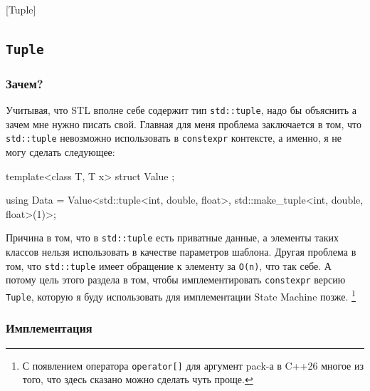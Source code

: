 [Tuple]


\subsection{\texttt{Tuple}}
\label{section::Tuple}

\subsubsection{Зачем?}

Учитывая, что STL вполне себе содержит тип \verb"std::tuple", надо бы объяснить а зачем мне нужно писать свой.
Главная для меня проблема заключается в том, что  \verb"std::tuple" невозможно использовать в \verb"constexpr" контексте, а именно, я не могу сделать следующее:
\begin{cppcode}[\nonumbers]
template<class T, T x>
struct Value {};

using Data = Value<std::tuple<int, double, float>, std::make_tuple<int, double, float>(1)>;
\end{cppcode}
Причина в том, что в \verb"std::tuple" есть приватные данные, а элементы таких классов нельзя использовать в качестве параметров шаблона.
Другая проблема в том, что \verb"std::tuple" имеет обращение к элементу за \verb"O(n)", что так себе.
А потому цель этого раздела в том, чтобы имплементировать \verb"constexpr" версию \verb"Tuple", которую я буду использовать для имплементации State Machine позже.%
\footnote{С появлением оператора \texttt{operator[]} для аргумент pack-а в C++26 многое из того, что здесь сказано можно сделать чуть проще.}

\subsubsection{Имплементация}

